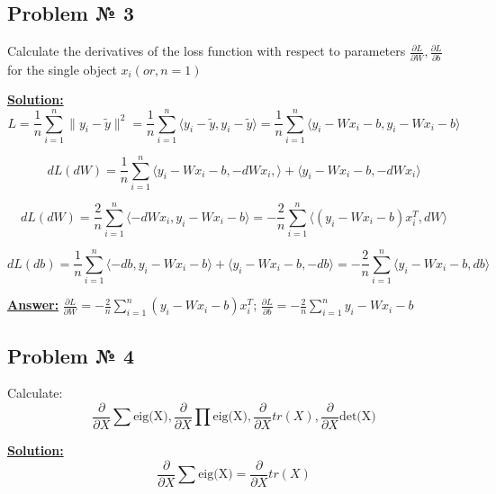 \subsection{Problem № 3} Calculate the derivatives of the loss function with respect to parameters $\frac{\partial L}{\partial W}, \frac{\partial L}{\partial b}$ for the single object $x_i (or, n = 1)$

\underline{\textbf{Solution:}}
\begin{equation*}
    L = \frac{1}{n} \sum\limits_{i=1}^n \|y_i - \tilde y \|^2 = \frac{1}{n} \sum\limits_{i=1}^n \langle y_i - \tilde y, y_i - \tilde y \rangle = \frac{1}{n} \sum\limits_{i=1}^n \langle y_i - Wx_i - b, y_i - Wx_i - b \rangle
\end{equation*}

\begin{equation*}
dL(dW) = \frac{1}{n} \sum\limits_{i=1}^n \langle y_i - Wx_i - b, -dWx_i, \rangle + \langle y_i - Wx_i - b, -dWx_i \rangle    
\end{equation*}

\begin{equation*}
dL(dW) = \frac{2}{n} \sum\limits_{i=1}^n \langle -dWx_i, y_i - Wx_i - b \rangle = -\frac{2}{n} \sum\limits_{i=1}^n \langle (y_i - Wx_i - b)x_i^T, dW \rangle 
\end{equation*}

\begin{equation*}
    dL(db) = \frac{1}{n} \sum\limits_{i=1}^n \langle -db, y_i - Wx_i - b \rangle + \langle y_i - Wx_i - b, -db \rangle = -\frac{2}{n} \sum\limits_{i=1}^n \langle y_i - Wx_i - b, db\rangle
\end{equation*}

\underline{\textbf{Answer:}} $\frac{\partial L}{\partial W} = -\frac{2}{n} \sum\limits_{i=1}^n  (y_i - Wx_i - b)x_i^T$; $ \frac{\partial L}{\partial b} = -\frac{2}{n} \sum\limits_{i=1}^n y_i - Wx_i - b $


\subsection{Problem № 4} 
Calculate: 
\begin{equation*}
\frac{\partial}{\partial X} \sum \text{eig(X)}, \frac{\partial}{\partial X} \prod \text{eig(X)}, \frac{\partial}{\partial X} tr(X), \frac{\partial}{\partial X} \text{det(X)}
\end{equation*}

\underline{\textbf{Solution:}}
\begin{equation*}
    \frac{\partial}{\partial X} \sum \text{eig(X)} = \frac{\partial}{\partial X} tr(X)
\end{equation*}

